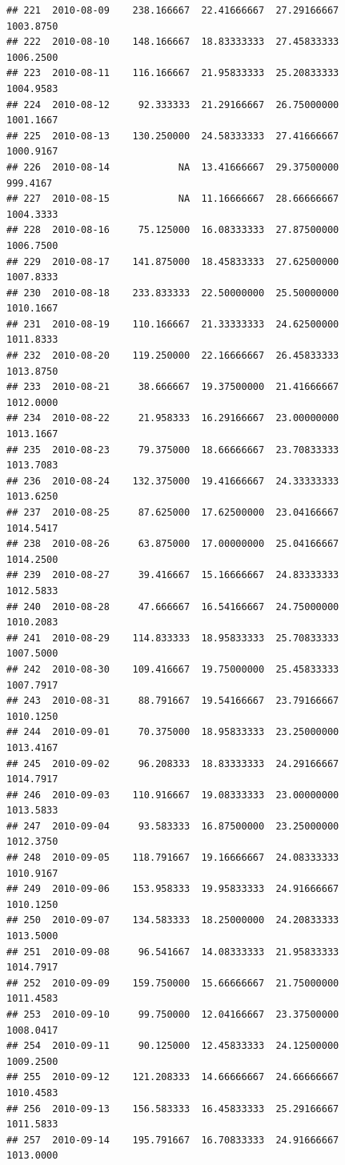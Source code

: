 \documentclass[
]{article}
\begin{document}
\begin{verbatim}
## 221  2010-08-09    238.166667  22.41666667  27.29166667    1003.8750
## 222  2010-08-10    148.166667  18.83333333  27.45833333    1006.2500
## 223  2010-08-11    116.166667  21.95833333  25.20833333    1004.9583
## 224  2010-08-12     92.333333  21.29166667  26.75000000    1001.1667
## 225  2010-08-13    130.250000  24.58333333  27.41666667    1000.9167
## 226  2010-08-14            NA  13.41666667  29.37500000     999.4167
## 227  2010-08-15            NA  11.16666667  28.66666667    1004.3333
## 228  2010-08-16     75.125000  16.08333333  27.87500000    1006.7500
## 229  2010-08-17    141.875000  18.45833333  27.62500000    1007.8333
## 230  2010-08-18    233.833333  22.50000000  25.50000000    1010.1667
## 231  2010-08-19    110.166667  21.33333333  24.62500000    1011.8333
## 232  2010-08-20    119.250000  22.16666667  26.45833333    1013.8750
## 233  2010-08-21     38.666667  19.37500000  21.41666667    1012.0000
## 234  2010-08-22     21.958333  16.29166667  23.00000000    1013.1667
## 235  2010-08-23     79.375000  18.66666667  23.70833333    1013.7083
## 236  2010-08-24    132.375000  19.41666667  24.33333333    1013.6250
## 237  2010-08-25     87.625000  17.62500000  23.04166667    1014.5417
## 238  2010-08-26     63.875000  17.00000000  25.04166667    1014.2500
## 239  2010-08-27     39.416667  15.16666667  24.83333333    1012.5833
## 240  2010-08-28     47.666667  16.54166667  24.75000000    1010.2083
## 241  2010-08-29    114.833333  18.95833333  25.70833333    1007.5000
## 242  2010-08-30    109.416667  19.75000000  25.45833333    1007.7917
## 243  2010-08-31     88.791667  19.54166667  23.79166667    1010.1250
## 244  2010-09-01     70.375000  18.95833333  23.25000000    1013.4167
## 245  2010-09-02     96.208333  18.83333333  24.29166667    1014.7917
## 246  2010-09-03    110.916667  19.08333333  23.00000000    1013.5833
## 247  2010-09-04     93.583333  16.87500000  23.25000000    1012.3750
## 248  2010-09-05    118.791667  19.16666667  24.08333333    1010.9167
## 249  2010-09-06    153.958333  19.95833333  24.91666667    1010.1250
## 250  2010-09-07    134.583333  18.25000000  24.20833333    1013.5000
## 251  2010-09-08     96.541667  14.08333333  21.95833333    1014.7917
## 252  2010-09-09    159.750000  15.66666667  21.75000000    1011.4583
## 253  2010-09-10     99.750000  12.04166667  23.37500000    1008.0417
## 254  2010-09-11     90.125000  12.45833333  24.12500000    1009.2500
## 255  2010-09-12    121.208333  14.66666667  24.66666667    1010.4583
## 256  2010-09-13    156.583333  16.45833333  25.29166667    1011.5833
## 257  2010-09-14    195.791667  16.70833333  24.91666667    1013.0000

\end{verbatim}
\end{document}
